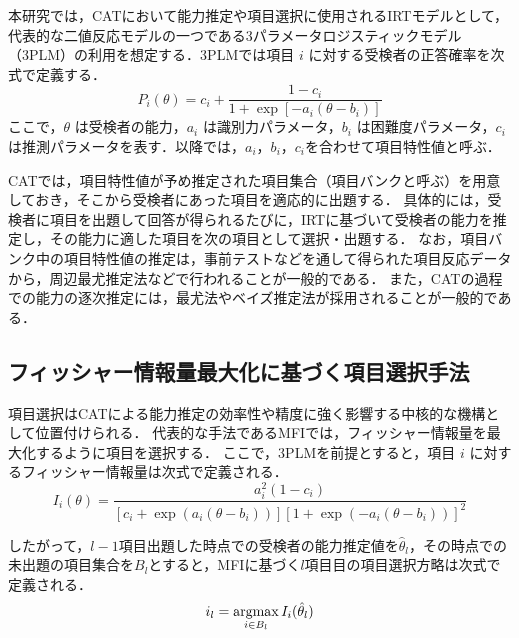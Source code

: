 \documentclass[dvipdfmx,a4j]{jarticle}
\newcommand{\argmax}{\mathop{\rm argmax}\limits}
\begin{document}
本研究では，CATにおいて能力推定や項目選択に使用されるIRTモデルとして，代表的な二値反応モデルの一つである3パラメータロジスティックモデル（3PLM）の利用を想定する．3PLMでは項目 $i$ に対する受検者の正答確率を次式で定義する．
\begin{equation}
P_i(\theta) = c_i + \frac{1 - c_i}{1 + \exp[-a_i(\theta - b_i)]}
\end{equation}
ここで，$\theta$ は受検者の能力，$a_i$ は識別力パラメータ，$b_i$ は困難度パラメータ，$c_i$ は推測パラメータを表す．以降では，$a_i$，$b_i$，$c_i$を合わせて項目特性値と呼ぶ．

CATでは，項目特性値が予め推定された項目集合（項目バンクと呼ぶ）を用意しておき，そこから受検者にあった項目を適応的に出題する．
具体的には，受検者に項目を出題して回答が得られるたびに，IRTに基づいて受検者の能力を推定し，その能力に適した項目を次の項目として選択・出題する．
なお，項目バンク中の項目特性値の推定は，事前テストなどを通して得られた項目反応データから，周辺最尤推定法などで行われることが一般的である．
また，CATの過程での能力の逐次推定には，最尤法やベイズ推定法が採用されることが一般的である．


\subsection{フィッシャー情報量最大化に基づく項目選択手法}

項目選択はCATによる能力推定の効率性や精度に強く影響する中核的な機構として位置付けられる．
代表的な手法であるMFIでは，フィッシャー情報量を最大化するように項目を選択する．
ここで，3PLMを前提とすると，項目 $i$ に対するフィッシャー情報量は次式で定義される．
\begin{equation}
I_i(\theta) =
\frac{a_i^2 (1 - c_i)}
{[c_i + \exp(a_i(\theta - b_i))][1 + \exp(-a_i(\theta - b_i))]^2}
\end{equation}

したがって，$l-1$項目出題した時点での受検者の能力推定値を$\hat{\theta}_l$，その時点での未出題の項目集合を$B_l$とすると，MFIに基づく$l$項目目の項目選択方略は次式で定義される．
\begin{equation}
i_l = \argmax_{i \in B_l} I_i(\hat{\theta}_l)
\end{equation}
\end{document}
